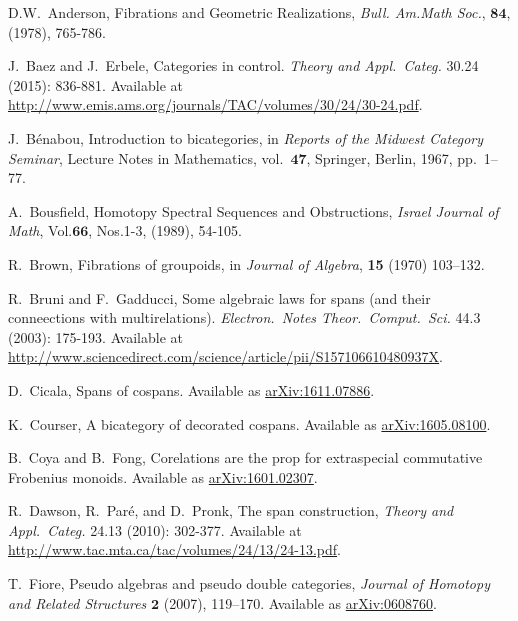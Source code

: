 \documentclass[11pt]{amsart}
\newcommand{\cat}[1]{\mathbf{#1}}
\theoremstyle{remark}
\theoremstyle{definition}
\begin{document}
%
\begin{thebibliography}{100}
D.W.\ Anderson,
Fibrations and Geometric Realizations,
\emph{Bull. Am.Math Soc.}, $\mathbf{84}$, (1978), 765-786.

J.~Baez and J.~Erbele,
Categories in control.
\emph{Theory and Appl.~Categ.} 
30.24 (2015): 836-881.
Available at \href{http://www.emis.ams.org/journals/TAC/volumes/30/24/30-24.pdf}{http://www.emis.ams.org/journals/TAC/volumes/30/24/30-24.pdf}.

J.~B\'enabou, 
Introduction to bicategories, 
in \emph{Reports of the Midwest Category Seminar}, 
Lecture Notes in Mathematics, 
vol.\ $\cat{47}$, 
Springer, Berlin, 1967, pp.\ 1--77. 

A.\ Bousfield,
Homotopy Spectral Sequences and Obstructions,
\emph{Israel Journal of Math},
Vol.$\mathbf{66}$, Nos.1-3, (1989), 54-105.

R.\ Brown,
Fibrations of groupoids,
in \emph{Journal of Algebra},
\textbf{15} (1970) 103--132.

R.~Bruni and F.~Gadducci,
Some algebraic laws for spans (and their conneections with multirelations).
\emph{Electron.~Notes Theor.~Comput.~Sci.}
44.3 (2003): 175-193.
Available at \href{http://www.sciencedirect.com/science/article/pii/S157106610480937X}{http://www.sciencedirect.com/science/article/pii/S157106610480937X}.

D.~Cicala, 
Spans of cospans.
Available as \href{https://arxiv.org/abs/1611.07886}{arXiv:1611.07886}.

K.~Courser, 
A bicategory of decorated cospans. 
Available as \href{https://arxiv.org/pdf/1605.08100v2.pdf}{arXiv:1605.08100}.

B.~Coya and B.~Fong,
Corelations are the prop for extraspecial commutative Frobenius monoids.
Available as \href{https://arxiv.org/abs/1601.02307}{arXiv:1601.02307}.

R.~Dawson, R.~Par\'{e}, and D.~Pronk, 
The span construction, 
\emph{Theory and Appl.~Categ.} 
24.13 (2010): 302-377.
Available at \href{http://www.tac.mta.ca/tac/volumes/24/13/24-13.pdf}{http://www.tac.mta.ca/tac/volumes/24/13/24-13.pdf}.

T.~Fiore, 
Pseudo algebras and pseudo double categories, 
\emph{Journal of Homotopy and Related Structures} $\mathbf{2}$ 
(2007), 119--170. 
Available as \href{http://arxiv.org/abs/math/0608760}{arXiv:0608760}.


\end{thebibliography}
\end{document}
